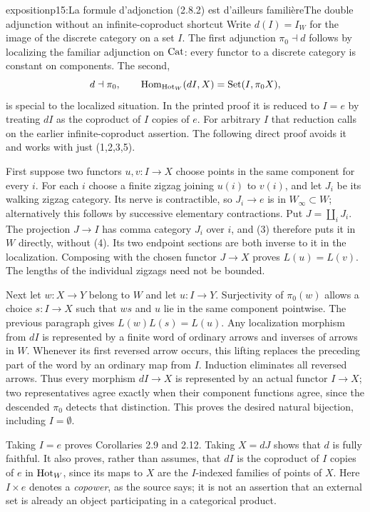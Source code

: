 \begin{dcomment}{exposition}{p15:La formule d'adjonction (2.8.2) est d'ailleurs familière}{The double adjunction without an infinite-coproduct shortcut}
Write $d(I)=I_W$ for the image of the discrete category on a set $I$. The first adjunction $\pi_0\dashv d$ follows by localizing the familiar adjunction on $\mathrm{Cat}$: every functor to a discrete category is constant on components. The second,
\[
d\dashv\pi_0,\qquad
\operatorname{Hom}_{\mathrm{Hot}_W}(dI,X)=\operatorname{Set}(I,\pi_0X),
\]
is special to the localized situation. In the printed proof it is reduced to $I=e$ by treating $dI$ as the coproduct of $I$ copies of $e$. For arbitrary $I$ that reduction calls on the earlier infinite-coproduct assertion. The following direct proof avoids it and works with just (1,2,3,5).

First suppose two functors $u,v:I\to X$ choose points in the same component for every $i$. For each $i$ choose a finite zigzag joining $u(i)$ to $v(i)$, and let $J_i$ be its walking zigzag category. Its nerve is contractible, so $J_i\to e$ is in $W_\infty\subset W$; alternatively this follows by successive elementary contractions. Put $J=\coprod_i J_i$. The projection $J\to I$ has comma category $J_i$ over $i$, and (3) therefore puts it in $W$ directly, without (4). Its two endpoint sections are both inverse to it in the localization. Composing with the chosen functor $J\to X$ proves $L(u)=L(v)$. The lengths of the individual zigzags need not be bounded.

Next let $w:X\to Y$ belong to $W$ and let $u:I\to Y$. Surjectivity of $\pi_0(w)$ allows a choice $s:I\to X$ such that $ws$ and $u$ lie in the same component pointwise. The previous paragraph gives $L(w)L(s)=L(u)$. Any localization morphism from $dI$ is represented by a finite word of ordinary arrows and inverses of arrows in $W$. Whenever its first reversed arrow occurs, this lifting replaces the preceding part of the word by an ordinary map from $I$. Induction eliminates all reversed arrows. Thus every morphism $dI\to X$ is represented by an actual functor $I\to X$; two representatives agree exactly when their component functions agree, since the descended $\pi_0$ detects that distinction. This proves the desired natural bijection, including $I=\emptyset$.

Taking $I=e$ proves Corollaries 2.9 and 2.12. Taking $X=dJ$ shows that $d$ is fully faithful. It also proves, rather than assumes, that $dI$ is the coproduct of $I$ copies of $e$ in $\mathrm{Hot}_W$, since its maps to $X$ are the $I$-indexed families of points of $X$. Here $I\times e$ denotes a \emph{copower}, as the source says; it is not an assertion that an external set is already an object participating in a categorical product.
\end{dcomment}


